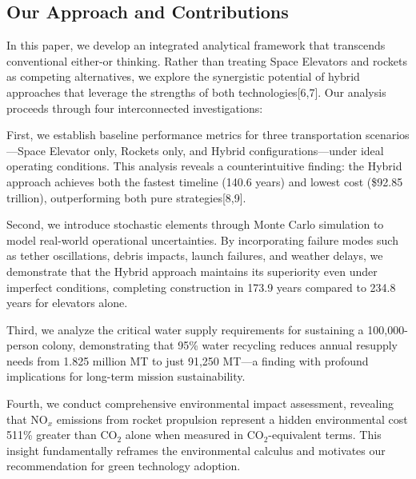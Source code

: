 \documentclass[12pt]{article}
\begin{document}
	\subsection{Our Approach and Contributions}
	
	In this paper, we develop an integrated analytical framework that transcends conventional either-or thinking. Rather than treating Space Elevators and rockets as competing alternatives, we explore the synergistic potential of hybrid approaches that leverage the strengths of both technologies[6,7]. Our analysis proceeds through four interconnected investigations:
	
	First, we establish baseline performance metrics for three transportation scenarios---Space Elevator only, Rockets only, and Hybrid configurations---under ideal operating conditions. This analysis reveals a counterintuitive finding: the Hybrid approach achieves both the fastest timeline (140.6 years) and lowest cost (\$92.85 trillion), outperforming both pure strategies[8,9].
	
	Second, we introduce stochastic elements through Monte Carlo simulation to model real-world operational uncertainties. By incorporating failure modes such as tether oscillations, debris impacts, launch failures, and weather delays, we demonstrate that the Hybrid approach maintains its superiority even under imperfect conditions, completing construction in 173.9 years compared to 234.8 years for elevators alone.
	
	Third, we analyze the critical water supply requirements for sustaining a 100,000-person colony, demonstrating that 95\% water recycling reduces annual resupply needs from 1.825 million MT to just 91,250 MT---a finding with profound implications for long-term mission sustainability.
	
	Fourth, we conduct comprehensive environmental impact assessment, revealing that NO$_x$ emissions from rocket propulsion represent a hidden environmental cost 511\% greater than CO$_2$ alone when measured in CO$_2$-equivalent terms. This insight fundamentally reframes the environmental calculus and motivates our recommendation for green technology adoption.
	
\end{document}
